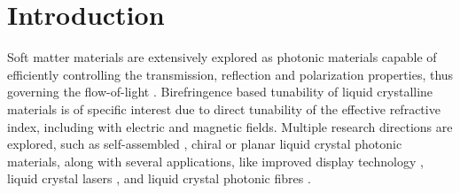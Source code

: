 \documentclass{osa-article}
\begin{document}
\section{Introduction}

Soft matter materials are extensively explored as photonic materials capable of efficiently controlling the 
transmission, reflection and polarization properties, thus governing the flow-of-light \cite{KobashiJ_NaturePhoton10_2016,BregarA_LiquidCrystalsReviews5_2017,mtm-metadevices}. 
Birefringence based tunability of liquid crystalline materials is of specific interest due to direct tunability of the effective refractive index, 
including with electric and magnetic fields. 
Multiple research directions are explored, such as self-assembled \cite{WangN_OptMaterExpress5_2015,KhooIC_ProgressinQuantumElectronics38_2014,GottardoS_PhysRevE74_2006},
chiral \cite{KobashiJ_SciRep7_2017,BarbozaR_PhysRevLett117_2016,AplincJ_LiqCryst43_2016}
or planar \cite{KobashiJ_NaturePhoton10_2016,KobashiJ_PhysRevLett116_2016} liquid crystal photonic materials, 
along with several applications, like improved display technology \cite{HuangY_OptMaterExpress7_2017,TanG_JPhysDApplPhys50_2017,KosaT_Nature485_2012},
liquid crystal lasers \cite{ColesH_NaturePhoton4_2010}, 
and liquid crystal photonic fibres \cite{WahleM_OptExpress24_2016,JullienA_OptExpress24_2016}. 
\end{document}
